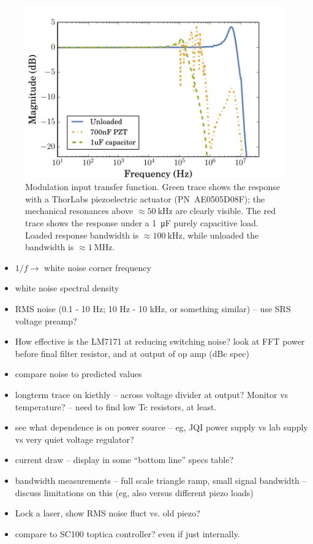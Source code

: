 \documentclass[aip,rsi,preprint,graphicx]{revtex4-1} %
\begin{document}
\begin{figure}[h]
\includegraphics[width=\columnwidth]{fig/PiezoModulationTransfer.pdf}
\caption{Modulation input transfer function. Green trace shows the response with a ThorLabs piezoelectric actuator {(PN~AE0505D08F)}; the mechanical resonances above $\approx\SI{50}{\kilo\hertz}$ are clearly visible. The red trace shows the response under a \SI{1}{\micro\farad} purely capacitive load. Loaded response bandwidth is $\approx\SI{100}{\kilo\hertz}$, while unloaded the bandwidth is $\approx\SI{1}{\mega\hertz}$.\label{Fig:TransferFunc}}
\end{figure}




\begin{itemize}
\item $1/f \rightarrow$ white noise corner frequency
\item white noise spectral density
\item RMS noise (0.1 - 10 Hz; 10 Hz - 10 kHz, or something similar) -- use SRS voltage preamp?
\item How effective is the LM7171 at reducing switching noise? look at FFT power before final filter resistor, and at output of op amp (dBc spec)
\item compare noise to predicted values
\item longterm trace on kiethly -- across voltage divider at output? Monitor vs temperature? -- need to find low Tc resistors, at least.
\item see what dependence is on power source -- eg, JQI power supply vs lab supply vs very quiet voltage regulator?
\item current draw -- display in some ``bottom line'' specs table?
\item bandwidth measurements -- full scale triangle ramp, small signal bandwidth -- discuss limitations on this (eg, also versus different piezo loads)
\item Lock a laser, show RMS noise fluct vs. old piezo?
\item compare to SC100 toptica controller? even if just internally.
\end{itemize}
\end{document}

